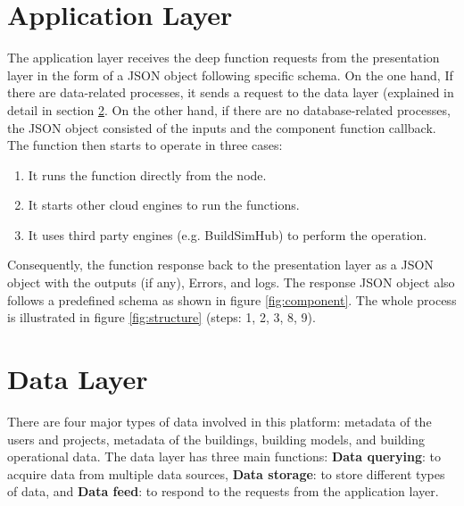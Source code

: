 \documentclass{scsSimAUDPaperFormat}
\begin{document}
\section{Application Layer}
The application layer receives the deep function requests from the presentation layer in the form of a JSON object following specific schema. On the one hand, If there are data-related processes, it sends a request to the data layer (explained in detail in section \ref{sec:datalayer}. On the other hand, if there are no database-related processes, the JSON object consisted of the inputs and the component function callback. The function then starts to operate in three cases:
\begin{enumerate}
    \item It runs the function directly from the node. 
    \item It starts other cloud engines to run the functions. 
    \item It uses third party engines (e.g. BuildSimHub) to perform the operation. 
\end{enumerate}
Consequently, the function response back to the presentation layer as a JSON object with the outputs (if any), Errors, and logs. The response JSON object also follows a predefined schema as shown in figure \ref{fig:component}. The whole process is illustrated in figure \ref{fig:structure} (steps: 1, 2, 3, 8, 9).


\section{Data Layer}\label{sec:datalayer}

There are four major types of data involved in this platform: metadata of the users and projects, metadata of the buildings, building models, and building operational data. The data layer has three main functions: \textbf{Data querying}: to acquire data from multiple data sources, \textbf{Data storage}: to store different types of data, and \textbf{Data feed}: to respond to the requests from the application layer.\par
\end{document}
